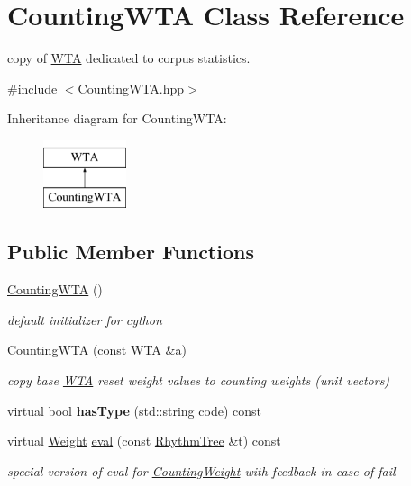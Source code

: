 \hypertarget{classCountingWTA}{}\section{Counting\+W\+TA Class Reference}
\label{classCountingWTA}


copy of \mbox{\hyperlink{classWTA}{W\+TA}} dedicated to corpus statistics.  




{\ttfamily \#include $<$Counting\+W\+T\+A.\+hpp$>$}

Inheritance diagram for Counting\+W\+TA\+:\begin{figure}[H]
\begin{center}
\leavevmode
\includegraphics[height=2.000000cm]{classCountingWTA}
\end{center}
\end{figure}
\subsection*{Public Member Functions}
\begin{DoxyCompactItemize}
\item 
\mbox{\hyperlink{group__schemata_gad46a7f821d01aed3719a585f66130e27}{Counting\+W\+TA}} ()
\begin{DoxyCompactList}\small\item\em default initializer for cython \end{DoxyCompactList}\item 
\mbox{\hyperlink{group__schemata_ga590bb9036b59d5cf81bbbedb18d19093}{Counting\+W\+TA}} (const \mbox{\hyperlink{classWTA}{W\+TA}} \&a)
\begin{DoxyCompactList}\small\item\em copy base \mbox{\hyperlink{classWTA}{W\+TA}} reset weight values to counting weights (unit vectors) \end{DoxyCompactList}\item 
\mbox{\label{classCountingWTA_a4ac4c2d11483cbd40420148e688e9e7f}} 
virtual bool {\bfseries has\+Type} (std\+::string code) const
\item 
virtual \mbox{\hyperlink{classWeight}{Weight}} \mbox{\hyperlink{group__schemata_ga2665883ffe41001dd7c2568bc9bef02f}{eval}} (const \mbox{\hyperlink{classRhythmTree}{Rhythm\+Tree}} \&t) const
\begin{DoxyCompactList}\small\item\em special version of eval for \mbox{\hyperlink{classCountingWeight}{Counting\+Weight}} with feedback in case of fail \end{DoxyCompactList}\end{DoxyCompactItemize}
